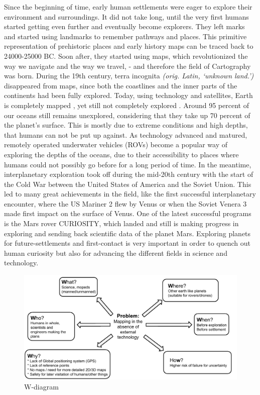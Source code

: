 Since the beginning of time, early human settlements were eager to explore their environment and surroundings. It did not take long, until the very first humans started getting even further and eventually become explorers. They left marks and started using landmarks to remember pathways and places. This primitive representation of prehistoric places and early history maps can be traced back to 24000-25000 BC\cite{cavedrawings}. Soon after, they started using maps, which revolutionized the way we navigate and the way we travel, - and therefore the field of Cartography was born. During the 19th century, terra incognita \textit{(orig. Latin, ‘unknown land.’)} disappeared from maps, since both the coastlines and the inner parts of the continents had been fully explored. Today, using technology and satellites, Earth is completely mapped %
, yet still not completely explored %
. Around 95 percent of our oceans still remains unexplored, considering that they take up 70 percent of the planet's surface\cite{oceandepth}. This is mostly due to extreme conditions and high depths, that humans can not be put up against. As technology advanced and matured, remotely operated underwater vehicles (ROVs) become a popular way of exploring the depths of the oceans, due to their accessibility to places where humans could not possibly go before for a long period of time. In the meantime, interplanetary exploration took off during the mid-20th century with the start of the Cold War between the United States of America and the Soviet Union. This led to many great achievements in the field, like the first successful interplanetary encounter, where the US Mariner 2 flew by Venus\cite{firstflyby} or when the Soviet Venera 3 made first impact on the surface of Venus\cite{firstimpact}. One of the latest successful programs is the Mars rover CURIOSITY, which landed and still is making progress in exploring and sending back scientific data of the planet Mars. Exploring planets for future-settlements and first-contact is very important in order to quench out human curiosity but also for advancing the different fields in science and technology.

\clearpage

\begin{figure}[!h]
	\centering
	\includegraphics[scale=.7]{images/wdiagram1.pdf}
	\caption{W-diagram}
	\label{fig:wdiagram}
\end{figure}

